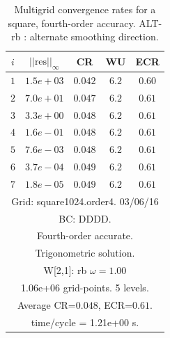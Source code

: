 \begin{table}[hbt]
\begin{center}
{\begin{tabular}{|c|c|c|c|c|}
 $i$   & $\vert\vert\mbox{res}\vert\vert_\infty$  &  CR     &  WU    & ECR  \\   \hline 
 $ 1$  & $ 1.5e+03$ & $0.042$ & $ 6.2$ & $0.60$ \\ 
 $ 2$  & $ 7.0e+01$ & $0.047$ & $ 6.2$ & $0.61$ \\ 
 $ 3$  & $ 3.3e+00$ & $0.048$ & $ 6.2$ & $0.61$ \\ 
 $ 4$  & $ 1.6e-01$ & $0.048$ & $ 6.2$ & $0.61$ \\ 
 $ 5$  & $ 7.6e-03$ & $0.048$ & $ 6.2$ & $0.61$ \\ 
 $ 6$  & $ 3.7e-04$ & $0.049$ & $ 6.2$ & $0.61$ \\ 
 $ 7$  & $ 1.8e-05$ & $0.049$ & $ 6.2$ & $0.61$ \\ 
\hline 
\multicolumn{5}{|c|}{Grid: square1024.order4. 03/06/16}  \\
\multicolumn{5}{|c|}{BC: DDDD.}  \\
\multicolumn{5}{|c|}{Fourth-order accurate.}  \\
\multicolumn{5}{|c|}{Trigonometric solution.}  \\
\multicolumn{5}{|c|}{W[2,1]: rb $\omega=1.00$}  \\
\multicolumn{5}{|c|}{1.06e+06 grid-points. 5 levels.}  \\
\multicolumn{5}{|c|}{Average CR=$0.048$, ECR=$0.61$.}  \\
\multicolumn{5}{|c|}{time/cycle = 1.21e+00 s.}  \\
\hline 
\end{tabular}
} %
\end{center}
\caption{Multigrid convergence rates for a square, fourth-order accuracy. ALT-rb : alternate smoothing direction.}
 \label{tab:square4} 
\end{table}











